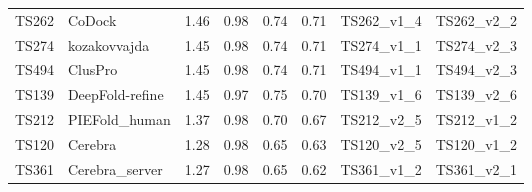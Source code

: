 \begin{table}[ht]
{\begin{tabular}{llllllll}
TS262 & CoDock & 1.46 & 0.98 & 0.74 & 0.71 & TS262\_v1\_4 & TS262\_v2\_2 \\ 
TS274 & kozakovvajda & 1.45 & 0.98 & 0.74 & 0.71 & TS274\_v1\_1 & TS274\_v2\_3 \\ 
TS494 & ClusPro & 1.45 & 0.98 & 0.74 & 0.71 & TS494\_v1\_1 & TS494\_v2\_3 \\ 
TS139 & DeepFold-refine & 1.45 & 0.97 & 0.75 & 0.70 & TS139\_v1\_6 & TS139\_v2\_6 \\ 
TS212 & PIEFold\_human & 1.37 & 0.98 & 0.70 & 0.67 & TS212\_v2\_5 & TS212\_v1\_2 \\ 
TS120 & Cerebra & 1.28 & 0.98 & 0.65 & 0.63 & TS120\_v2\_5 & TS120\_v1\_2 \\ 
TS361 & Cerebra\_server & 1.27 & 0.98 & 0.65 & 0.62 & TS361\_v1\_2 & TS361\_v2\_1 \\ 
\bottomrule
\end{tabular}%
}
\end{table}

